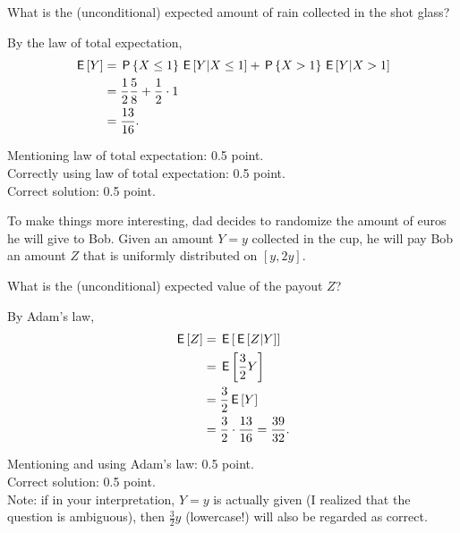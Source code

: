 \begin{exercise}[1.5]
What is the (unconditional) expected amount of rain collected in the shot glass?
\begin{solution}
By the law of total expectation,
\begin{align}
    \,\mathsf{E}\left[Y\right] &= \,\mathsf{P}\left\{X \leq 1\right\} \,\mathsf{E}\left[Y | X \leq 1\right] + \,\mathsf{P}\left\{X > 1\right\} \,\mathsf{E}\left[Y | X > 1\right] \\
    &= \frac{1}{2} \frac{5}{8} + \frac{1}{2} \cdot 1 \\
    &= \frac{13}{16}.
\end{align}

Mentioning law of total expectation: 0.5 point.\\
Correctly using law of total expectation: 0.5 point.\\
Correct solution: 0.5 point.
\end{solution}
\end{exercise}

To make things more interesting, dad decides to randomize the amount of euros he will give to Bob. Given an amount $Y=y$ collected in the cup, he will pay Bob an amount $Z$ that is uniformly distributed on $[y,2y]$.

\begin{exercise}[1]
What is the (unconditional) expected value of the payout $Z$?
\begin{solution}
By Adam's law,
\begin{align}
    \,\mathsf{E}\left[Z\right] &= \,\mathsf{E}\left[\,\mathsf{E}\left[Z|Y\right]\right] \\
    &= \,\mathsf{E}\left[\frac{3}{2}Y\right] \\
    &= \frac{3}{2}\,\mathsf{E}\left[Y\right] \\
    &= \frac{3}{2} \cdot \frac{13}{16} = \frac{39}{32}.
\end{align}

Mentioning and using Adam's law: 0.5 point.\\
Correct solution: 0.5 point.\\

Note: if in your interpretation, $Y=y$ is actually given (I realized that the question is ambiguous), then $\frac{3}{2}y$ (lowercase!) will also be regarded as correct.
\end{solution}
\end{exercise}